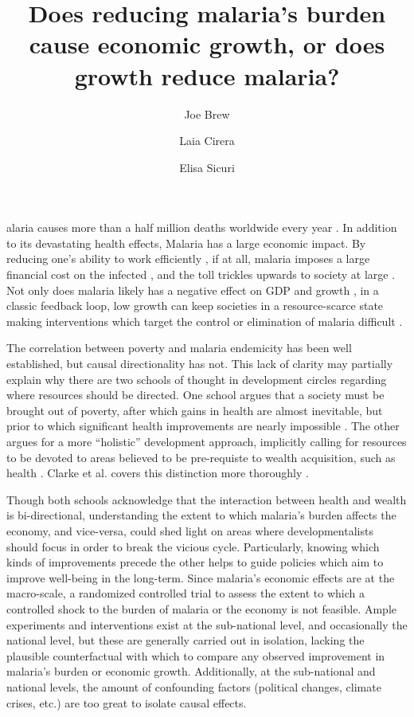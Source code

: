 \documentclass[9pt,twocolumn,twoside,lineno]{pnas-new}
\title{Does reducing malaria's burden cause economic growth, or does growth reduce malaria?}
\author[a,b,1]{Joe Brew}
\author[a]{Laia Cirera}
\author[a,c]{Elisa Sicuri}
\affil[a]{Barcelona Institute for Global Health: c/ Rosselló, 132, 5è 2a. 08036, Barcelona, Catalonia}
\affil[b]{VU University Amsterdam: De Boelelaan 1105, 1081 HV Amsterdam, Netherlands}
\affil[c]{Imperial College London: South Kensington Campus, London SW7 2AZ, U.K., UK}
\begin{document}
\maketitle
\thispagestyle{firststyle}


alaria causes more than a half million deaths worldwide every year \cite{White}. In addition to its devastating health effects, Malaria has a large economic impact.  By reducing one’s ability to work efficiently \cite{Nonvignon2016-vt}, if at all, malaria imposes a large financial cost on the infected \cite{Asenso-Okyere1997-wj} \cite{Ajani2010-dd}, and the toll trickles upwards to society at large \cite{Sachs2002-ig}. Not only does malaria likely has a negative effect on GDP and growth \cite{McCarthy2000-wl, Orem2012-kr, Hong2011-sa, Sachs2002-ig}, in a classic feedback loop, low growth can keep societies in a resource-scarce state making interventions which target the control or elimination of malaria difficult \cite{White, Purdy2013-rt, Howard2017-pk, Phillips1998-ky}. 

The correlation between poverty and malaria endemicity has been well established, but causal directionality has not. This lack of clarity may partially explain why there are two schools of thought in development circles regarding where resources should be directed. One school argues that a society must be brought out of poverty, after which gains in health are almost inevitable, but prior to which significant health improvements are nearly impossible \cite{Musgrove1996-hm}.  The other argues for a more “holistic” development approach, implicitly calling for resources to be devoted to areas believed to be pre-requiste to wealth acquisition, such as health \cite{Storm2008-dd, Sen_undated-gp}.  Clarke et al. covers this distinction more thoroughly \cite{Clarke_JA2016-ik}.

Though both schools acknowledge that the interaction between health and wealth is bi-directional, understanding the extent to which malaria’s burden affects the economy, and vice-versa, could shed light on areas where developmentalists should focus in order to break the vicious cycle. Particularly, knowing which kinds of improvements precede the other helps to guide policies which aim to improve well-being in the long-term. Since malaria’s economic effects are at the macro-scale, a randomized controlled trial to assess the extent to which a controlled shock to the burden of malaria or the economy is not feasible. Ample experiments and interventions exist at the sub-national level, and occasionally the national level, but these are generally carried out in isolation, lacking the plausible counterfactual with which to compare any observed improvement in malaria’s burden or economic growth. Additionally, at the sub-national and national levels, the amount of confounding factors (political changes, climate crises, etc.) are too great to isolate causal effects. 
\end{document}
